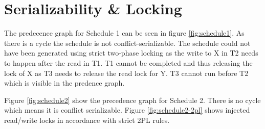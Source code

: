 \documentclass{article}
\title{}
\author{Ronni Elken Lindsgaard}
\begin{document}
\maketitle
\section{Serializability \& Locking}
The predecence graph for Schedule 1 can be seen in figure \ref{fig:schedule1}.
As there is a cycle the schedule is not conflict-serializable. The schedule
could not have been generated using strict two-phase locking as the write to X
in T2 needs to happen after the read in T1. T1 cannot be completed and thus
releasing the lock of X as T3 needs to release the read lock for Y. T3 cannot
run before T2 which is visible in the predence graph. 



Figure \ref{fig:schedule2} show the precedence graph for Schedule 2. There is no
cycle which means it is conflict serializable. Figure \ref{fig:schedule2-2pl}
shows injected read/write locks in accordance with strict 2PL rules.
 


\end{document}

